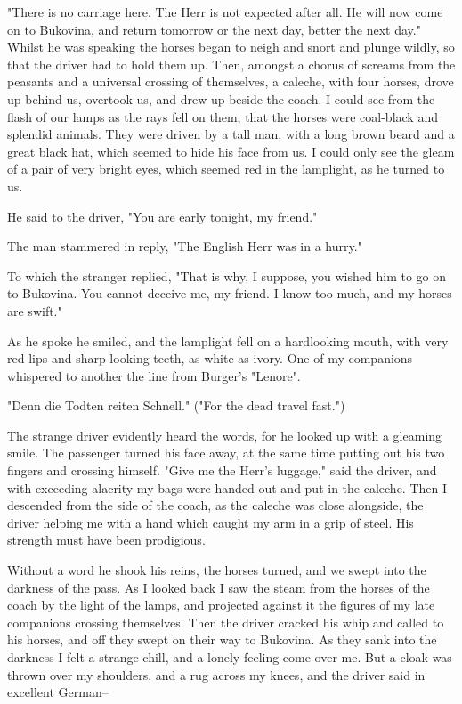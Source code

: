 "There is no carriage here. The Herr is not expected after all. He will now come on to Bukovina, and return tomorrow or the next day, better the next day." Whilst he was speaking the horses began to neigh and snort and plunge wildly, so that the driver had to hold them up. Then, amongst a chorus of screams from the peasants and a universal crossing of themselves, a caleche, with four horses, drove up behind us, overtook us, and drew up beside the coach. I could see from the flash of our lamps as the rays fell on them, that the horses were coal-black and splendid animals. They were driven by a tall man, with a long brown beard and a great black hat, which seemed to hide his face from us. I could only see the gleam of a pair of very bright eyes, which seemed red in the lamplight, as he turned to us. 

He said to the driver, "You are early tonight, my friend." 

The man stammered in reply, "The English Herr was in a hurry." 

To which the stranger replied, "That is why, I suppose, you wished him to go on to Bukovina. You cannot deceive me, my friend. I know too much, and my horses are swift." 

As he spoke he smiled, and the lamplight fell on a hardlooking mouth, with very red lips and sharp-looking teeth, as white as ivory. One of my companions whispered to another the line from Burger's "Lenore". 

"Denn die Todten reiten Schnell." ("For the dead travel fast.") 

The strange driver evidently heard the words, for he looked up with a gleaming smile. The passenger turned his face away, at the same time putting out his two fingers and crossing himself. "Give me the Herr's luggage," said the driver, and with exceeding alacrity my bags were handed out and put in the caleche. Then I descended from the side of the coach, as the caleche was close alongside, the driver helping me with a hand which caught my arm in a grip of steel. His strength must have been prodigious. 

Without a word he shook his reins, the horses turned, and we swept into the darkness of the pass. As I looked back I saw the steam from the horses of the coach by the light of the lamps, and projected against it the figures of my late companions crossing themselves. Then the driver cracked his whip and called to his horses, and off they swept on their way to Bukovina. As they sank into the darkness I felt a strange chill, and a lonely feeling come over me. But a cloak was thrown over my shoulders, and a rug across my knees, and the driver said in excellent German-- 

